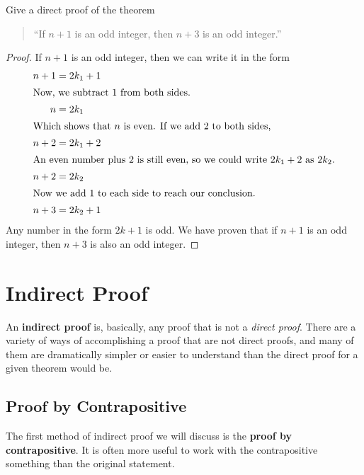\begin{ex}
  Give a direct proof of the theorem
  \begin{quote}
    ``If $n+1$ is an odd integer, then $n+3$ is an odd integer.''
  \end{quote}
  \begin{proof}
    If $n+1$ is an odd integer, then we can write it in the form
    \begin{align*}
      n+1 &= 2k_1+1 \\
      \intertext{Now, we subtract $1$ from both sides.}
      n &= 2k_1 \\ \intertext{Which shows that $n$ is even. If we add $2$ to both sides,}
      n+2 &= 2k_1 +2 \\
      \intertext{An even number plus $2$ is still even, so we could write $2k_1+2$ as $2k_2$.}
      n+2 &= 2k_2 \\
      \intertext{Now we add $1$ to each side to reach our conclusion.}
      n+3 &= 2k_2 + 1
    \end{align*}
    Any number in the form $2k+1$ is odd.
    We have proven that if $n+1$ is an odd integer, then $n+3$ is also an odd integer.
  \end{proof}
\end{ex}

\section{Indirect Proof}

An \textbf{indirect proof} is, basically, any proof that is not a \emph{direct proof}.
There are a variety of ways of accomplishing a proof that are not direct proofs,
and many of them are dramatically simpler or easier to understand than the direct
proof for a given theorem would be.

\subsection{Proof by Contrapositive}\label{sec:contrapositive}
The first method of indirect proof we will discuss is the \textbf{proof by contrapositive}.
It is often more useful to work with the contrapositive something than the original statement.

